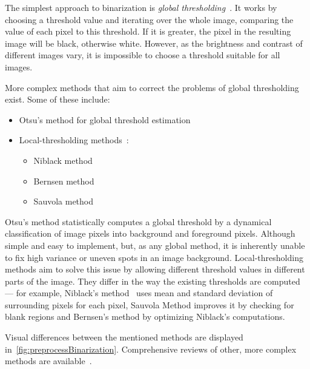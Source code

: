The simplest approach to binarization is \emph{global thresholding}~\citep{globalThresh}. It works by choosing a threshold value and iterating over the whole image, comparing the value of each pixel to this threshold. If it is greater, the pixel in the resulting image will be black, otherwise white. However, as the brightness and contrast of different images vary, it is impossible to choose a threshold suitable for all images.

More complex methods that aim to correct the problems of global thresholding exist. Some of these include:
\begin{itemize}
\item Otsu's method for global threshold estimation~\citep{otsu}
\item Local-thresholding methods~\citep{localOtherBin}:
\begin{itemize}
\item Niblack method
\item Bernsen method
\item Sauvola method
\end{itemize}
\end{itemize}

Otsu's method statistically computes a global threshold by a dynamical classification of image pixels into background and foreground pixels. Although simple and easy to implement, but, as any global method, it is inherently unable to fix high variance or uneven spots in an image background. Local-thresholding methods aim to solve this issue by allowing different threshold values in different parts of the image. They differ in the way the existing thresholds are computed --- for example, Niblack's method~\citep{adaptiveBin} uses mean and standard deviation of surrounding pixels for each pixel, Sauvola Method improves it by checking for blank regions and Bernsen's method by optimizing Niblack's computations. 

Visual differences between the mentioned methods are displayed in~\cref{fig:preprocessBinarization}. Comprehensive reviews of other, more complex methods are available~\citep{localOtherBin}.

